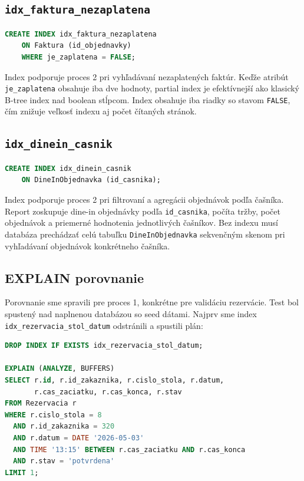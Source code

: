 \documentclass[11pt, a4paper]{article}
\begin{document}
\subsection*{\texttt{idx\_faktura\_nezaplatena}}

\begin{lstlisting}[language=SQL]
CREATE INDEX idx_faktura_nezaplatena
    ON Faktura (id_objednavky)
    WHERE je_zaplatena = FALSE;
\end{lstlisting}

Index podporuje proces 2 pri vyhľadávaní nezaplatených faktúr.
Keďže atribút \texttt{je\_zaplatena} obsahuje iba dve hodnoty, partial index je efektívnejší
ako klasický B-tree index nad boolean stĺpcom. Index obsahuje iba riadky so stavom
\texttt{FALSE}, čím znižuje veľkosť indexu aj počet čítaných stránok.

\subsection*{\texttt{idx\_dinein\_casnik}}

\begin{lstlisting}[language=SQL]
CREATE INDEX idx_dinein_casnik
    ON DineInObjednavka (id_casnika);
\end{lstlisting}

Index podporuje proces 2 pri filtrovaní a agregácii objednávok podľa čašníka.
Report zoskupuje dine-in objednávky podľa \texttt{id\_casnika}, počíta tržby,
počet objednávok a priemerné hodnotenia jednotlivých čašníkov. Bez indexu musí
databáza prechádzať celú tabuľku \texttt{DineInObjednavka} sekvenčným skenom pri
vyhľadávaní objednávok konkrétneho čašníka.

\subsection*{EXPLAIN porovnanie}

Porovnanie sme spravili pre proces 1, konkrétne pre validáciu rezervácie. Test bol spustený nad
naplnenou databázou so seed dátami. Najprv sme index \texttt{idx\_rezervacia\_stol\_datum}
odstránili a spustili plán:

\begin{lstlisting}[language=SQL]
DROP INDEX IF EXISTS idx_rezervacia_stol_datum;

EXPLAIN (ANALYZE, BUFFERS)
SELECT r.id, r.id_zakaznika, r.cislo_stola, r.datum,
       r.cas_zaciatku, r.cas_konca, r.stav
FROM Rezervacia r
WHERE r.cislo_stola = 8
  AND r.id_zakaznika = 320
  AND r.datum = DATE '2026-05-03'
  AND TIME '13:15' BETWEEN r.cas_zaciatku AND r.cas_konca
  AND r.stav = 'potvrdena'
LIMIT 1;
\end{lstlisting}
\end{document}
